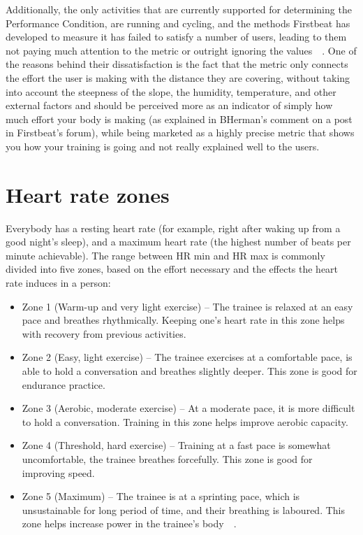 Additionally, the only activities that are currently supported for determining the Performance Condition, are running and cycling,
and the methods Firstbeat has developed to measure it has failed to satisfy a number of users, leading to them not paying much attention to the metric or outright ignoring the values~\cite{performance-condition-unreliable1}~\cite{performance-condition-unreliable-reasoning}.
One of the reasons behind their dissatisfaction is the fact that the metric only connects the effort the user is making with the distance they are covering,
without taking into account the steepness of the slope, the humidity, temperature, and other external factors 
and should be perceived more as an indicator of simply how much effort your body is making (as explained in BHerman's comment on a post~\cite{performance-condition-unreliable-reasoning} in Firstbeat's forum), 
while being marketed as a highly precise metric that shows you how your training is going and not really explained well to the users.

\section{Heart rate zones}

Everybody has a resting heart rate (for example, right after waking up from a good night's sleep), and a maximum heart rate (the highest number of beats per minute achievable).
The range between HR min and HR max is commonly divided into five zones, based on the effort necessary and the effects the heart rate induces in a person:
\begin{itemize}
    \item Zone 1 (Warm-up and very light exercise) --
    The trainee is relaxed at an easy pace and breathes rhythmically. Keeping one's heart rate in this zone helps with recovery from previous activities.
    \item Zone 2 (Easy, light exercise) --
    The trainee exercises at a comfortable pace, is able to hold a conversation and breathes slightly deeper. This zone is good for endurance practice.
    \item Zone 3 (Aerobic, moderate exercise) --
    At a moderate pace, it is more difficult to hold a conversation. Training in this zone helps improve aerobic capacity.
    \item Zone 4 (Threshold, hard exercise) --
    Training at a fast pace is somewhat uncomfortable, the trainee breathes forcefully. This zone is good for improving speed.
    \item Zone 5 (Maximum) --
    The trainee is at a sprinting pace, which is unsustainable for long period of time, and their breathing is laboured.
    This zone helps increase power in the trainee's body~\cite{garmin-heart-zones}~\cite{polar-heart-zones}.
\end{itemize}

